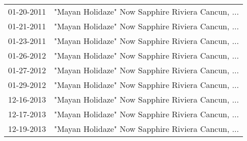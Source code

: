 \begin{supertabular}{ll}
 01-20-2011 &  "Mayan Holidaze" Now Sapphire Riviera Cancun, ... \\
 01-21-2011 &  "Mayan Holidaze" Now Sapphire Riviera Cancun, ... \\
 01-23-2011 &  "Mayan Holidaze" Now Sapphire Riviera Cancun, ... \\
 01-26-2012 &  "Mayan Holidaze" Now Sapphire Riviera Cancun, ... \\
 01-27-2012 &  "Mayan Holidaze" Now Sapphire Riviera Cancun, ... \\
 01-29-2012 &  "Mayan Holidaze" Now Sapphire Riviera Cancun, ... \\
 12-16-2013 &  "Mayan Holidaze" Now Sapphire Riviera Cancun, ... \\
 12-17-2013 &  "Mayan Holidaze" Now Sapphire Riviera Cancun, ... \\
 12-19-2013 &  "Mayan Holidaze" Now Sapphire Riviera Cancun, ... \\
\end{supertabular}
